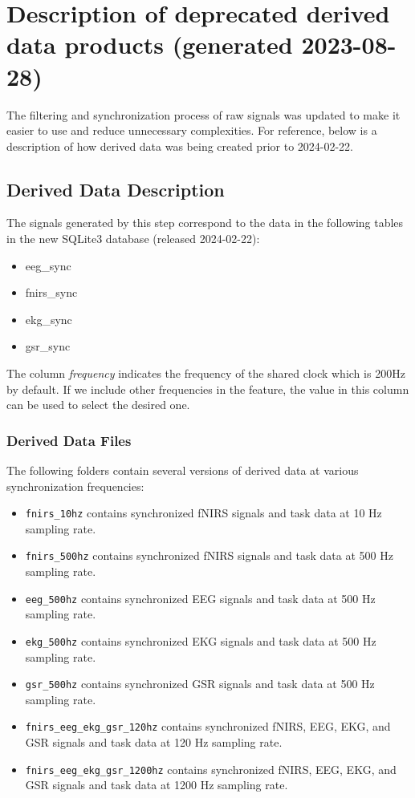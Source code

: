 \chapter{Description of deprecated derived data products (generated 2023-08-28)}

The filtering and synchronization process of raw signals was updated to make it
easier to use and reduce unnecessary complexities. For reference, below is a
description of how derived data was being created prior to 2024-02-22.

\section{Derived Data Description}

The signals generated by this step correspond to the data in the following tables in the
new SQLite3 database (released 2024-02-22):

\begin{itemize}
	\item eeg\_sync
	\item fnirs\_sync
	\item ekg\_sync
	\item gsr\_sync
\end{itemize}

The column \emph{frequency} indicates the frequency of the shared clock which
is 200Hz by default. If we include other frequencies in the feature, the value
in this column can be used to select the desired one.


\subsection{Derived Data Files}

The following folders contain several versions of derived data at various synchronization frequencies:
\begin{itemize}
  \item \texttt{fnirs\_10hz} contains synchronized fNIRS signals and task data at 10 Hz sampling rate.
  \item \texttt{fnirs\_500hz} contains synchronized fNIRS signals and task data at 500 Hz sampling rate.
  \item \texttt{eeg\_500hz} contains synchronized EEG signals and task data at 500 Hz sampling rate.
  \item \texttt{ekg\_500hz} contains synchronized EKG signals and task data at 500 Hz sampling rate.
  \item \texttt{gsr\_500hz} contains synchronized GSR signals and task data at 500 Hz sampling rate.
  \item \texttt{fnirs\_eeg\_ekg\_gsr\_120hz} contains synchronized fNIRS, EEG, EKG, and GSR signals and task data at 120 Hz sampling rate.
  \item \texttt{fnirs\_eeg\_ekg\_gsr\_1200hz} contains synchronized fNIRS, EEG, EKG, and GSR signals and task data at 1200 Hz sampling rate.
\end{itemize}

